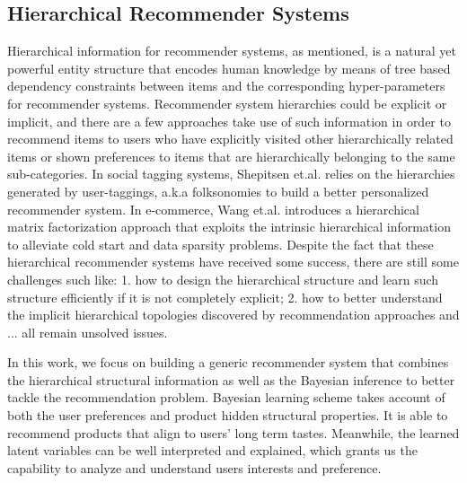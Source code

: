 \subsection{Hierarchical Recommender Systems}

Hierarchical information for recommender systems, as mentioned, is a natural yet powerful entity structure that encodes human knowledge by means of tree based dependency constraints between items and the corresponding hyper-parameters for recommender systems.  Recommender system hierarchies could be explicit or implicit, and there are a few approaches take use of such information in order to recommend items to users who have explicitly visited other hierarchically related items or shown preferences to items that are hierarchically belonging to the same sub-categories.  In social tagging systems, Shepitsen et.al. \cite{shepitsen2008personalized} relies on the hierarchies generated by user-taggings, a.k.a folksonomies to build a better personalized recommender system.  In e-commerce, Wang et.al. \cite{wang2018exploring} introduces a hierarchical matrix factorization approach that exploits the intrinsic hierarchical information to alleviate cold start and data sparsity problems.  Despite the fact that these hierarchical recommender systems have received some success, there are still some challenges such like: 1. how to design the hierarchical structure and learn such structure efficiently if it is not completely explicit; 2. how to better understand the implicit hierarchical topologies discovered by recommendation approaches and ... all remain unsolved issues.

In this work, we focus on building a generic recommender system that combines the hierarchical structural information as well as the Bayesian inference to better tackle the recommendation problem.  Bayesian learning scheme takes account of both the user preferences and product hidden structural properties. It is able to recommend products that align to users' long term tastes. Meanwhile, the learned latent variables can be well interpreted and explained, which grants us the capability to analyze and understand users interests and preference.